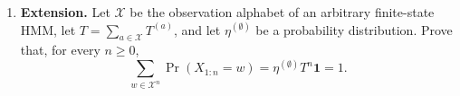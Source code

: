 \begin{exercise}
\begin{enumerate}
\begin{enumerate}
        \item Form $T=T^{(0)}+T^{(1)}$ and verify that it is row-stochastic.

        \item Calculate $\Pr(X_{1:3}=011)$ and
          $\Pr(X_{1:3}=010)$ both by tracing paths through the diagram and by
          multiplying the appropriate symbol matrices. Explain how the second
          calculation reflects the defining constraint of the Even Process.
      \end{enumerate}

    \item \textbf{Extension.} Let $\mathcal X$ be the observation alphabet of
      an arbitrary finite-state HMM, let
      $T=\sum_{a\in\mathcal X}T^{(a)}$, and let
      $\eta^{(\emptyset)}$ be a probability distribution. Prove that, for
      every $n\geq 0$,
      \[
        \sum_{w\in\mathcal X^n}\Pr(X_{1:n}=w)
          =\eta^{(\emptyset)}T^n\mathbf 1
          =1.
      \]
  \end{enumerate}
\end{exercise}

